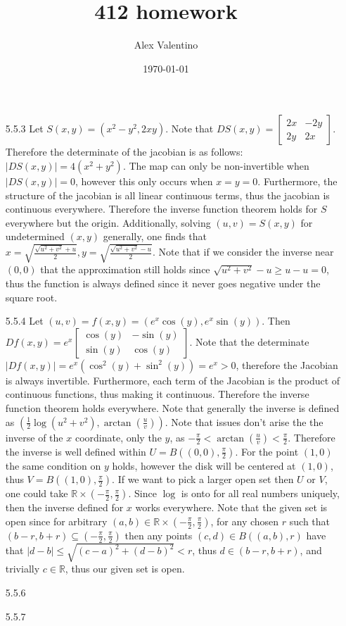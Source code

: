 \documentclass[12pt, letterpaper]{article}
\date{\today}
\author{Alex Valentino}
\title{412 homework}
\newcommand{\R}{\mathbb{R}}
\begin{document}
\begin{enumerate}
	\item[5.5.3] Let $S(x,y) = (x^2 - y^2, 2xy)$.  Note that 
	$DS(x,y) = \begin{bmatrix} 2x & -2y\\ 2y & 2x \end{bmatrix}.$ 
	Therefore the determinate of the jacobian is as follows:
	$|DS(x,y)| = 4(x^2 + y^2)$.  The map can only be non-invertible 
	when $|DS(x,y)| = 0$, however this only occurs when $x=y=0$.  
	Furthermore, the structure of the jacobian is all linear continuous
	terms, thus the jacobian is continuous everywhere.  Therefore 
	the inverse function theorem holds for $S$ everywhere but the 
	origin.  Additionally, solving $(u,v) = S(x,y)$ for undetermined 
	$(x,y)$ generally, one finds that $x = \sqrt{\frac{\sqrt{u^2 + v^2} + u}{2}}, y = \sqrt{\frac{\sqrt{u^2 + v^2} - u}{2}}$.  Note that if 
	we consider the inverse near $(0,0)$ that the approximation still 
	holds since $\sqrt{u^2 + v^2} - u \geq u - u = 0$, thus the function
	is always defined since it never goes negative under the square root.
	\item[5.5.4] Let $(u,v) = f(x,y) = (e^x \cos(y), e^x \sin(y))$.
	Then $Df(x,y) = e^x \begin{bmatrix}  \cos(y) & - \sin(y)\\ 
	\sin(y) & \cos(y)
	\end{bmatrix}$.  Note that the determinate $|Df(x,y)| = e^x(\cos^2(y) + \sin^2(y)) = e^x > 0$, therefore the Jacobian is always
	invertible. Furthermore, each term of the Jacobian is the product of 
	continuous functions, thus making it continuous.  Therefore 
	the inverse function theorem holds everywhere.  Note that 
	generally the inverse is defined as $(\frac{1}{2}\log ({u^2 + v^2}), 
	\arctan(\frac{u}{v}))$.  Note that issues don't arise the the 
	inverse of the $x$ coordinate, only the $y$, as 
	$- \frac{\pi}{2} < \arctan(\frac{u}{v}) < \frac{\pi}{2}$.  Therefore 
	the inverse is well defined within $U = B((0,0),\frac{\pi}{2})$.  For 
	the point $(1,0)$ the same condition on $y$ holds, however the disk 
	will be centered at $(1,0)$, thus $V = B((1,0),\frac{\pi}{2})$.  
	If we want to pick a larger open set then $U$ or $V$, one could 
	take $\R \times (-\frac{\pi}{2},\frac{\pi}{2})$.  Since $\log$ is 
	onto for all real numbers uniquely, then the inverse defined for $x$ works
	everywhere.  Note that the given set is open since for arbitrary 
	$(a,b) \in \R \times (-\frac{\pi}{2},\frac{\pi}{2})$, for any 
	chosen $r$ such that $(b-r,b+r) \subseteq (-\frac{\pi}{2},\frac{\pi}{2})$ then any points $(c,d) \in B((a,b),r)$ have that $|d-b| \leq \sqrt{(c-a)^2 + (d-b)^2} < r$, thus $d \in (b-r,b+r)$, and trivially 
	$c \in \R$, thus our given set is open.  
	\item[5.5.6]
	\item[5.5.7]
\end{enumerate}
\end{document}
